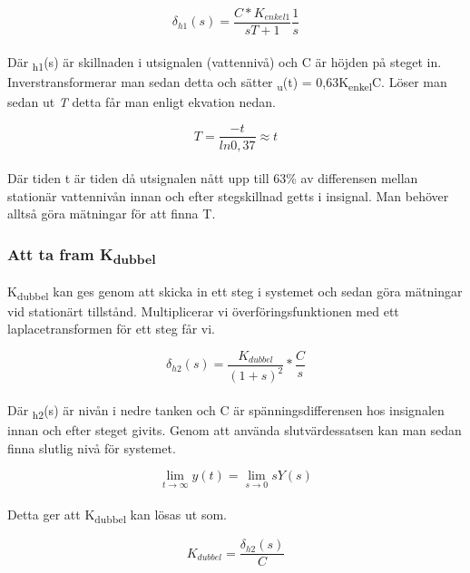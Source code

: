 \documentclass[a4wide]{article}
\begin{document}
\begin{equation}
\delta_{h1}(s) = \frac{C * K_{enkel1}}{sT+1}\frac{1}{s}
\end{equation}
\\
Där \textdelta\textsubscript{h1}(s) är skillnaden i utsignalen (vattennivå) och C är höjden på steget in. Inverstransformerar man sedan detta och sätter \textdelta\textsubscript{u}(t) = 0,63K\textsubscript{enkel}C. Löser man sedan ut {\itshape T} detta får man enligt ekvation nedan. 

\begin{equation}
T = \frac{-t}{ln{0,37}} \approx t
\end{equation}
\\
Där tiden t är tiden då utsignalen nått upp till 63\% av differensen mellan stationär vattennivån innan och efter stegskillnad getts i insignal. Man behöver alltså göra mätningar för att finna T. 
\\



\subsubsection{Att ta fram K\textsubscript{dubbel}}
K\textsubscript{dubbel} kan ges genom att skicka in ett steg i systemet och sedan göra mätningar vid stationärt tillstånd. Multiplicerar vi överföringsfunktionen med ett laplacetransformen för ett steg får vi. 

\begin{equation}
\delta_{h2}(s) = \frac{K_{dubbel}}{(1+s)^2}*\frac{C}{s}
\end{equation}
\\
Där \textdelta\textsubscript{h2}(s) är nivån i nedre tanken och C är spänningsdifferensen hos insignalen innan och efter steget givits. Genom att använda slutvärdessatsen kan man sedan finna slutlig nivå för systemet. 

\begin{equation}
\lim\limits_{t \to \infty}y(t) = \lim\limits_{s \to 0}sY(s)
\end{equation}
\\
Detta ger att K\textsubscript{dubbel} kan lösas ut som. 

\begin{equation}
K_{dubbel} = \frac{\delta_{h2}(s)}{C}
\end{equation}
\\


\end{document}
